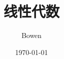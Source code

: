 \documentclass[a4paper,12pt]{article}
\begin{document}
    \title{线性代数}
    \author{Bowen}
    \date{\today}
    \maketitle
    \renewcommand{\contentsname}{}
    \tableofcontents
    \newpage

    

    

    

%    
\end{document}
